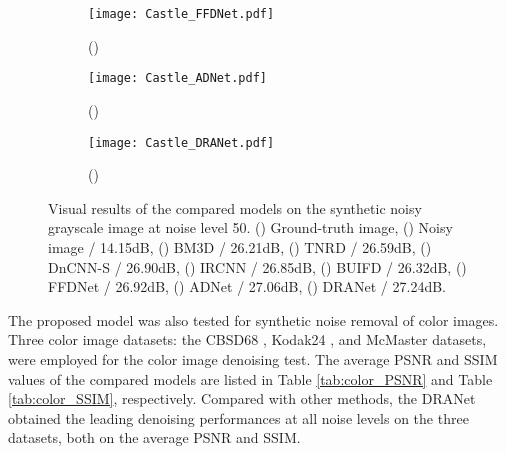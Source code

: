 \documentclass[3p,times]{elsarticle}
\begin{document}
\begin{figure*}[htbp]
\begin{subfigure}{0.18\linewidth}
		\centering
		\texttt{[image: Castle\_FFDNet.pdf]}
		\caption{()}
	\end{subfigure}
    \centering
	\begin{subfigure}{0.18\linewidth}
		\centering
		\texttt{[image: Castle\_ADNet.pdf]}
		\caption{()}
	\end{subfigure}
    \centering
	\begin{subfigure}{0.18\linewidth}
		\centering
		\texttt{[image: Castle\_DRANet.pdf]}
		\caption{()}
	\end{subfigure}
\caption{Visual results of the compared models on the synthetic noisy grayscale image at noise level 50. () Ground-truth image, () Noisy image / 14.15dB, () BM3D / 26.21dB, () TNRD / 26.59dB, () DnCNN-S / 26.90dB, () IRCNN / 26.85dB, () BUIFD / 26.32dB, () FFDNet / 26.92dB, () ADNet / 27.06dB, () DRANet / 27.24dB.}
\label{fig:Castle}
\end{figure*}

The proposed model was also tested for synthetic noise removal of color images. Three color image datasets: the CBSD68 \cite{Roth2005}, Kodak24 \cite{Kodak24}, and McMaster \cite{Zhang2011} datasets, were employed for the color image denoising test. The average PSNR and SSIM values of the compared models are listed in Table \ref{tab:color_PSNR} and Table \ref{tab:color_SSIM}, respectively. Compared with other methods, the DRANet obtained the leading denoising performances at all noise levels on the three datasets, both on the average PSNR and SSIM.
\end{document}
